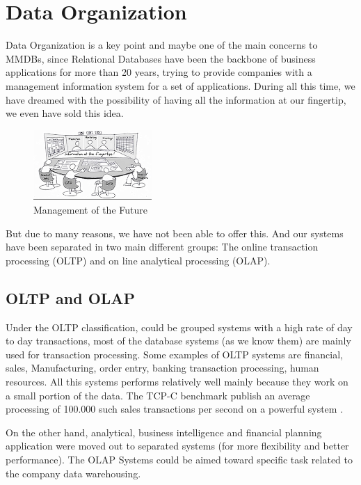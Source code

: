 \documentclass[12pt]{article} %
\begin{document}
\section{Data Organization}

Data Organization is a key point and maybe one of the main concerns to MMDBs, since Relational Databases have been the backbone of business applications for more  than 20 years, trying to provide companies with a management information system for a set of applications. During all this time, we have dreamed with the possibility of having all the information at our fingertip, we even have sold this idea\cite{Plattner}.

\begin{figure}
  \begin{center}
    \includegraphics[width=0.4\textwidth]{./pictures/fig5}
  \end{center}
  \caption{Management of the Future}
  \label{fig:fig5}
\end{figure}

    But due to many reasons, we have not been able to offer this. And our systems have been separated in two main different groups: The online transaction processing (OLTP) and on line analytical processing (OLAP).

\subsection{OLTP and OLAP}
    Under the OLTP classification, could be grouped systems with a high rate of day to day transactions, most of the database systems (as we know them) are mainly used for transaction processing. Some examples of OLTP systems are financial, sales, Manufacturing, order entry, banking transaction processing, human resources. All this systems performs relatively well mainly because they work on a small portion of the data. The TCP-C benchmark publish an average processing of 100.000 such sales transactions per second on a powerful system \cite{Kemper}.
    
    On the other hand, analytical, business intelligence and financial planning application were moved out to separated systems (for more flexibility and better performance). The OLAP Systems could be aimed toward specific task related to the company data warehousing. 
    
\end{document}
